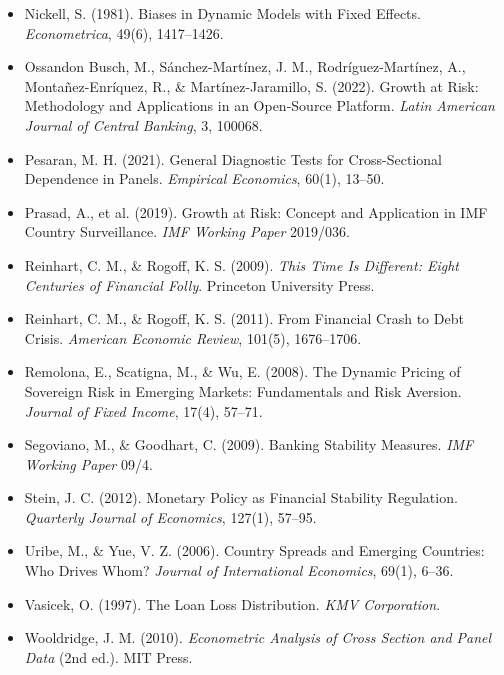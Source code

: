 \documentclass[5p,times,twocolumn,authoryear]{elsarticle}
\begin{document}
\begin{itemize}
    \item Nickell, S. (1981). Biases in Dynamic Models with Fixed Effects. \textit{Econometrica}, 49(6), 1417–1426.
    \item Ossandon Busch, M., Sánchez-Martínez, J. M., Rodríguez-Martínez, A., Montañez-Enríquez, R., \& Martínez-Jaramillo, S. (2022). Growth at Risk: Methodology and Applications in an Open-Source Platform. \textit{Latin American Journal of Central Banking}, 3, 100068.
    \item Pesaran, M. H. (2021). General Diagnostic Tests for Cross-Sectional Dependence in Panels. \textit{Empirical Economics}, 60(1), 13–50.
    \item Prasad, A., et al. (2019). Growth at Risk: Concept and Application in IMF Country Surveillance. \textit{IMF Working Paper} 2019/036.
    \item Reinhart, C. M., \& Rogoff, K. S. (2009). \textit{This Time Is Different: Eight Centuries of Financial Folly}. Princeton University Press.
    \item Reinhart, C. M., \& Rogoff, K. S. (2011). From Financial Crash to Debt Crisis. \textit{American Economic Review}, 101(5), 1676–1706.
    \item Remolona, E., Scatigna, M., \& Wu, E. (2008). The Dynamic Pricing of Sovereign Risk in Emerging Markets: Fundamentals and Risk Aversion. \textit{Journal of Fixed Income}, 17(4), 57–71.
    \item Segoviano, M., \& Goodhart, C. (2009). Banking Stability Measures. \textit{IMF Working Paper} 09/4.
    \item Stein, J. C. (2012). Monetary Policy as Financial Stability Regulation. \textit{Quarterly Journal of Economics}, 127(1), 57–95.
    \item Uribe, M., \& Yue, V. Z. (2006). Country Spreads and Emerging Countries: Who Drives Whom? \textit{Journal of International Economics}, 69(1), 6–36.
    \item Vasicek, O. (1997). The Loan Loss Distribution. \textit{KMV Corporation}.
    \item Wooldridge, J. M. (2010). \textit{Econometric Analysis of Cross Section and Panel Data} (2nd ed.). MIT Press.
\end{itemize}
\end{document}
